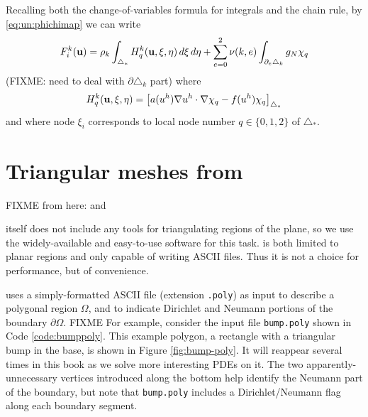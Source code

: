 Recalling both the change-of-variables formula for integrals and the chain rule, by \eqref{eq:un:phichimap} we can write
\begin{equation}
F_i^k(\mathbf{u}) = \rho_k \int_{\triangle_\ast} H_q^k(\mathbf{u},\xi,\eta)\,d\xi\,d\eta  + \sum_{e=0}^2 \nu(k,e) \int_{\partial_e \triangle_k} g_N \chi_q \label{eq:un:elementintegralreference}
\end{equation}
(FIXME: need to deal with $\partial\triangle_k$ part) where
\begin{equation}
H_q^k(\mathbf{u},\xi,\eta) = \left[a(u^h) \nabla u^h \cdot \nabla \chi_q - f(u^h) \chi_q\right]_{\triangle_\ast}  \label{eq:un:elementintegrand}
\end{equation}
and where node $\xi_i$ corresponds to local node number $q\in\{0,1,2\}$ of $\triangle_\ast$.


\section{Triangular meshes from \Triangle}

FIXME from here: \pIS and \pSNES

\PETSc itself does not include any tools for triangulating regions of the plane, so we use the widely-available and easy-to-use \Triangle{} software \citep{Shewchuk1996} for this task.  \Triangle is both limited to planar regions and only capable of writing ASCII files.  Thus it is not a choice for performance, but of convenience.

\Triangle uses a simply-formatted ASCII file (extension \texttt{.poly}) as input to describe a polygonal region $\Omega$, and to indicate Dirichlet and Neumann portions of the boundary $\partial \Omega$.  FIXME For example, consider the input file \texttt{bump.poly} shown in Code \ref{code:bumppoly}.  This example polygon, a rectangle with a triangular bump in the base, is shown in Figure \ref{fig:bump-poly}.  It will reappear several times in this book as we solve more interesting PDEs on it.  The two apparently-unnecessary vertices introduced along the bottom help identify the Neumann part of the boundary, but note that \texttt{bump.poly} includes a Dirichlet/Neumann flag along each boundary segment.


